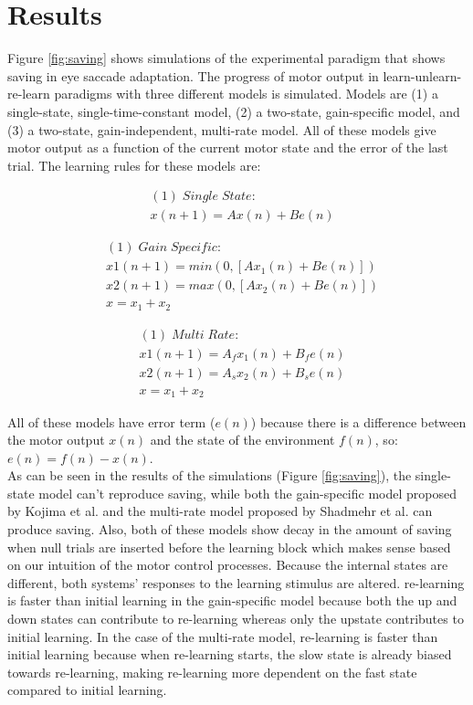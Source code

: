\documentclass[9pt,twocolumn]{paper-template}
\begin{document}
\section*{Results}
Figure \ref{fig:saving} shows simulations of the experimental paradigm that shows saving in eye saccade adaptation. The progress of motor output in learn-unlearn-re-learn paradigms with three different models is simulated. Models are (1) a single-state, single-time-constant model, (2) a two-state, gain-specific model, and (3) a two-state, gain-independent, multi-rate model. All of these models give motor output as a function of the current motor state and the error of the last trial. The learning rules for these models are:

\begin{eqnarray*}
& (1)\;Single\;State:\\
& x(n+1) = Ax(n)+Be(n)
\end{eqnarray*}

\begin{eqnarray*}
& (1)\;Gain\;Specific:\\
&x1(n+1) = min(0,[Ax_1(n)+Be(n)])\\
&x2(n+1) = max(0,[Ax_2(n)+Be(n)])\\
&x = x_1+x_2
\end{eqnarray*}


\begin{eqnarray*}
& (1)\;Multi\;Rate:\\
& x1(n+1) = A_fx_1(n) + B_fe(n)\\
& x2(n+1) = A_sx_2(n) + B_se(n)\\
&x = x_1+x_2
\end{eqnarray*}

All of these models have error term ($e(n)$) because there is a difference between the motor output $x(n)$ and the state of the environment $f(n)$, so: $e(n) = f (n) - x(n)$.\\
As can be seen in the results of the simulations (Figure \ref{fig:saving}), the single-state model can't reproduce saving, while both the gain-specific model proposed by Kojima et al. and the multi-rate model proposed by Shadmehr et al. can produce saving. Also, both of these models show decay in the amount of saving when null trials are inserted before the learning block which makes sense based on our intuition of the motor control processes. Because the internal states are different, both systems’ responses to the learning stimulus are altered. re-learning is faster than initial learning in the gain-specific model because both the up and down states can contribute to re-learning whereas only the upstate contributes to initial learning. In the case of the multi-rate model, re-learning is faster than initial learning because when re-learning starts, the
slow state is already biased towards re-learning, making re-learning more dependent on the fast state compared to initial learning.\\
\end{document}
